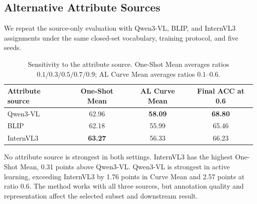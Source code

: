 \subsection{Alternative Attribute Sources}

We repeat the source-only evaluation with Qwen3-VL, BLIP, and InternVL3 assignments under the same closed-set vocabulary, training protocol, and five seeds.

\begin{table}[htbp]
\centering
\caption{Sensitivity to the attribute source. One-Shot Mean averages ratios $0.1/0.3/0.5/0.7/0.9$; AL Curve Mean averages ratios $0.1$--$0.6$.}
\label{tab:attribute-source-ablation}
\small
\setlength{\tabcolsep}{6pt}
\begin{tabular}{l c c c}
\toprule
\rowcolor{sectiongray} \textbf{Attribute source} & \textbf{One-Shot Mean} & \textbf{AL Curve Mean} & \textbf{Final ACC at 0.6} \\
\midrule
Qwen3-VL & 62.96 & \textbf{58.09} & \textbf{68.80} \\
BLIP & 62.18 & 55.99 & 65.46 \\
InternVL3 & \textbf{63.27} & 56.33 & 66.23 \\
\bottomrule
\end{tabular}
\end{table}

No attribute source is strongest in both settings. InternVL3 has the highest One-Shot Mean, 0.31 points above Qwen3-VL. Qwen3-VL is strongest in active learning, exceeding InternVL3 by 1.76 points in Curve Mean and 2.57 points at ratio $0.6$. The method works with all three sources, but annotation quality and representation affect the selected subset and downstream result.
